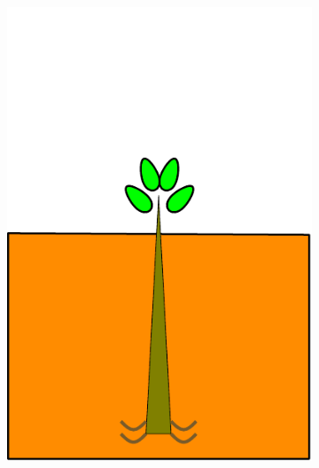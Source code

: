 \documentclass[10pt]{article}
\begin{document}
\begin{figure}[!ht]
\begin{subfigure}[b]{.1125\linewidth}
\includegraphics[width=1.0\linewidth]{img/tree_pics_2}
\caption{}  %
\label{fig:grow_2}
\end{subfigure}
\begin{subfigure}[b]{.1125\linewidth}
\centering

\end{subfigure}
\end{figure}
\end{document}
